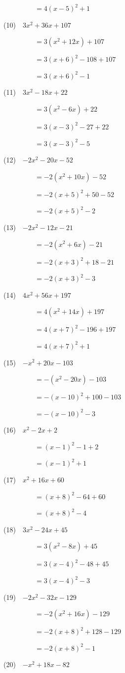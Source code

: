 \documentclass[a4j,twocolumn,10pt,fleqn]{jarticle}
\begin{document}
~~~~~~~~~$=4(x-5)^2 +1$

(10)~~$3x^2 +36x +107$

~~~~~~~~~$=3(x^2 +12x) +107$

~~~~~~~~~$=3(x +6)^2-108+107$

~~~~~~~~~$=3(x +6)^2-1$

(11)~~$3x^2-18x +22$

~~~~~~~~~$=3(x^2-6x) +22$

~~~~~~~~~$=3(x-3)^2-27+22$

~~~~~~~~~$=3(x-3)^2-5$

(12)~~$-2x^2-20x-52$

~~~~~~~~~$=-2(x^2 +10x)-52$

~~~~~~~~~$=-2(x +5)^2 +50-52$

~~~~~~~~~$=-2(x +5)^2-2$

(13)~~$-2x^2-12x-21$

~~~~~~~~~$=-2(x^2 +6x)-21$

~~~~~~~~~$=-2(x +3)^2 +18-21$

~~~~~~~~~$=-2(x +3)^2-3$

(14)~~$4x^2 +56x +197$

~~~~~~~~~$=4(x^2 +14x) +197$

~~~~~~~~~$=4(x +7)^2-196+197$

~~~~~~~~~$=4(x +7)^2 +1$

(15)~~$-x^2 +20x-103$

~~~~~~~~~$=-(x^2-20x)-103$

~~~~~~~~~$=-(x-10)^2 +100-103$

~~~~~~~~~$=-(x-10)^2-3$

(16)~~$x^2-2x +2$

~~~~~~~~~$=(x-1)^2 -1+2$

~~~~~~~~~$=(x-1)^2 +1$

(17)~~$x^2 +16x +60$

~~~~~~~~~$=(x +8)^2 -64+60$

~~~~~~~~~$=(x +8)^2-4$

(18)~~$3x^2-24x +45$

~~~~~~~~~$=3(x^2-8x) +45$

~~~~~~~~~$=3(x-4)^2-48+45$

~~~~~~~~~$=3(x-4)^2-3$

(19)~~$-2x^2-32x-129$

~~~~~~~~~$=-2(x^2 +16x)-129$

~~~~~~~~~$=-2(x +8)^2 +128-129$

~~~~~~~~~$=-2(x +8)^2-1$

(20)~~$-x^2 +18x-82$
\end{document}
